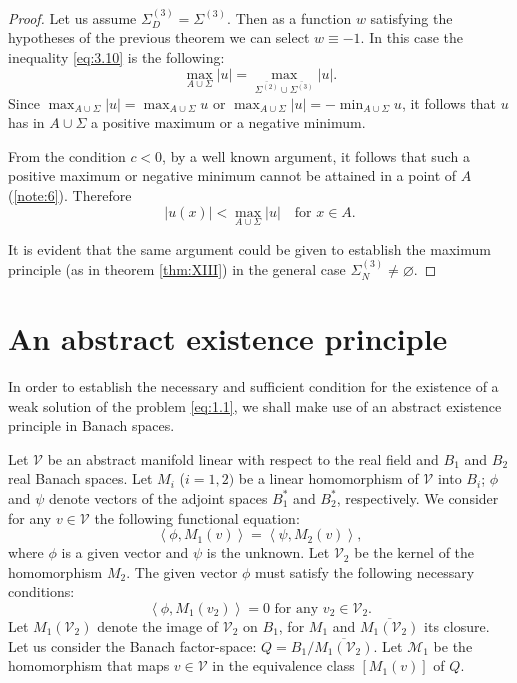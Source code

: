\documentclass[a4paper,12pt,leqno]{article}
\numberwithin{equation}{section}
\begin{document}
\begin{proof}
	Let us assume $\Sigma_{D}^{(3)}=\Sigma^{(3)}$. Then as a function $w$ satisfying the hypotheses of the previous theorem we can select $w \equiv-1$. 
	In this case the inequality \eqref{eq:3.10} is the following:
	\begin{equation*}
		\max_{A \cup \Sigma}|u|=\max_{\overline{\Sigma^{(2)}} \cup \overline{\Sigma^{(3)}}} |u|.
	\end{equation*}
	Since $\max_{A \cup \Sigma}|u| = \max _{A \cup \Sigma} u$ or $\max_{A \cup \Sigma}|u| = - \min_{A \cup \Sigma} u$, it follows that $u$ has in $A\cup\Sigma$ a positive maximum or a negative minimum.
	
	From the condition $c<0$, by a well known argument, it follows that such a positive maximum or negative minimum cannot be attained in a point of $A$ (\ref{note:6}). 
	Therefore
	\begin{equation*}
		|u(x)| < \max_{A\cup\Sigma} |u|
		\quad \text{for } x \in A.
	\end{equation*}
	
	It is evident that the same argument could be given to establish the maximum principle (as in theorem \ref{thm:XIII}) in the general case $\Sigma_{N}^{(3)} \neq \varnothing$.
\end{proof}


\section{An abstract existence principle}

In order to establish the necessary and sufficient condition for the existence of a weak solution of the problem \eqref{eq:1.1}, we shall make use of an abstract existence principle in Banach spaces.

Let $\mathscr{V}$ be an abstract manifold linear with respect to the real field and $B_{1}$ and $B_{2}$ real Banach spaces. Let $M_{i}$ ($i=1,2)$ be a linear homomorphism of $\mathscr{V}$ into ${B}_{i}$; $\phi$ and $\psi$ denote vectors of the adjoint spaces $B_{1}^{*}$ and $B_{2}^{*}$, respectively. We consider for any ${v} \in \mathscr{V}$ the following functional equation:
\begin{equation} \label{eq:4.1}
	\left\langle\phi, {M}_{1}(v)\right\rangle=\left\langle\psi, M_{2}(v)\right\rangle,
\end{equation}
where $\phi$ is a given vector and $\psi$ is the unknown. Let $\mathscr{V}_2$ be the kernel of the homomorphism $M_{2}$. The given vector $\phi$ must satisfy the following necessary conditions:
\begin{equation} \label{eq:4.2}
	\left\langle\phi, M_{1}\left(v_{2}\right)\right\rangle=0
	\text{ for any } 
	v_{2} \in \mathscr{V}_{2} .
\end{equation}
Let $M_{1}\left(\mathscr{V}_{2}\right)$ denote the image of $\mathscr{V}_{2}$ on $B_{1}$, for $M_{1}$ and $\overline{M_{1}\left(\mathscr{V}_{2}\right)}$ its closure. Let us consider the Banach factor-space: $Q={B}_{1} / \overline{M_{1}\left(\mathscr{V}_{2}\right)}$.
Let $\mathscr{M}_{1}$ be the homomorphism that maps $v \in \mathscr{V}$ in the equivalence class $\left[M_{1}(v)\right]$ of $Q$.
\end{document}
